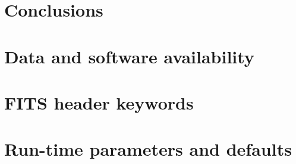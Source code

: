 \documentclass{aa}
\begin{document}
\section{Conclusions}\label{sec:conclusions}

\section{Data and software availability}\label{sec:data}

\begin{acknowledgements}
\end{acknowledgements}




\begin{appendix}
\section{FITS header keywords}\label{app:fits}
\section{Run-time parameters and defaults}\label{app:params}
\end{appendix}
\end{document}
